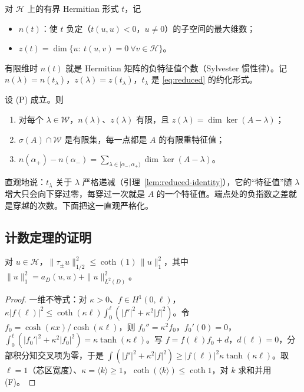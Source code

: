 \documentclass[11pt,a4paper,fontset=fandol]{ctexart}
\begin{document}
对 $\mathcal H$ 上的有界 Hermitian 形式 $t$，记
\begin{itemize}
\item $n(t)$：使 $t$ 负定（$t(u,u)<0$，$u\ne0$）的子空间的最大维数；
\item $z(t)=\dim\{u:\ t(u,v)=0\ \forall v\in\mathcal H\}$。
\end{itemize}
有限维时 $n(t)$ 就是 Hermitian 矩阵的负特征值个数（Sylvester 惯性律）。记 $n(\lambda)=n(t_\lambda)$，$z(\lambda)=z(t_\lambda)$，$t_\lambda$ 是 \eqref{eq:reduced} 的约化形式。

\begin{theorem}[计数定理]
\label{thm:count}
设 (P) 成立。则
\begin{enumerate}
\item 对每个 $\lambda\in\mathcal W$，$n(\lambda)$、$z(\lambda)$ 有限，且 $z(\lambda)=\dim\ker(A-\lambda)$；
\item $\sigma(A)\cap\mathcal W$ 是有限集，每一点都是 $A$ 的有限重特征值；
\item $\displaystyle n(\alpha_+)-n(\alpha_-)=\sum_{\lambda\in[\alpha_-,\alpha_+)}\dim\ker(A-\lambda)$。
\end{enumerate}
\end{theorem}

直观地说：$t_\lambda$ 关于 $\lambda$ 严格递减（引理~\ref{lem:reduced-identity}），它的“特征值”随 $\lambda$ 增大只会向下穿过零，每穿过一次就是 $A$ 的一个特征值。端点处的负指数之差就是穿越的次数。下面把这一直观严格化。

\subsection{计数定理的证明}

\begin{lemma}[端口迹不等式]
\label{lem:trace}
对 $u\in\mathcal H$，$\|\tau_\pm u\|_{1/2}^2\le\coth(1)\,\|u\|_1^2$，其中 $\|u\|_1^2=a_D(u,u)+\|u\|_{L^2(D)}^2$。
\end{lemma}

\begin{proof}
一维不等式：对 $\kappa>0$、$f\in H^1(0,\ell)$，$\kappa|f(\ell)|^2\le\coth(\kappa\ell)\int_0^\ell(|f'|^2+\kappa^2|f|^2)$。令 $f_0=\cosh(\kappa x)/\cosh(\kappa\ell)$，则 $f_0''=\kappa^2f_0$，$f_0'(0)=0$，$\int_0^\ell(|f_0'|^2+\kappa^2|f_0|^2)=\kappa\tanh(\kappa\ell)$。写 $f=f(\ell)f_0+d$，$d(\ell)=0$，分部积分知交叉项为零，于是 $\int(|f'|^2+\kappa^2|f|^2)\ge|f(\ell)|^2\kappa\tanh(\kappa\ell)$。取 $\ell=1$（芯区宽度）、$\kappa=\langle k\rangle\ge1$，$\coth(\langle k\rangle)\le\coth1$，对 $k$ 求和并用 (F)。
\end{proof}
\end{document}
